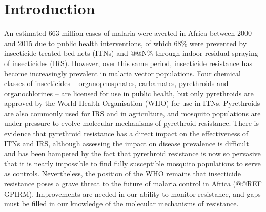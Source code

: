 \documentclass[a4paper,11pt,abstracton]{scrartcl}
\begin{document}
\section*{Introduction}


%
An estimated 663 million cases of malaria were averted in Africa between 2000 and 2015 due to public health interventions, of which 68\% were prevented by insecticide-treated bed-nets (ITNs) and @@N\% through indoor residual spraying of insecticides (IRS).
%
However, over this same period, insecticide resistance has become increasingly prevalent in malaria vector populations.
%
Four chemical classes of insecticides -- organophosphates, carbamates, pyrethroids and organochlorines -- are licensed for use in public health, but only pyrethroids are approved by the World Health Organisation (WHO) for use in ITNs.
%
Pyrethroids are also commonly used for IRS and in agriculture, and mosquito populations are under pressure to evolve molecular mechanisms of pyrethroid resistance.
%
There is evidence that pyrethroid resistance has a direct impact on the effectiveness of ITNs and IRS, although assessing the impact on disease prevalence is difficult and has been hampered by the fact that pyrethroid resistance is now so pervasive that it is nearly impossible to find fully susceptible mosquito populations to serve as controls.
%
Nevertheless, the position of the WHO remains that insecticide resistance poses a grave threat to the future of malaria control in Africa (@@REF GPIRM).
%
Improvements are needed in our ability to monitor resistance, and gaps must be filled in our knowledge of the molecular mechanisms of resistance.
\end{document}
